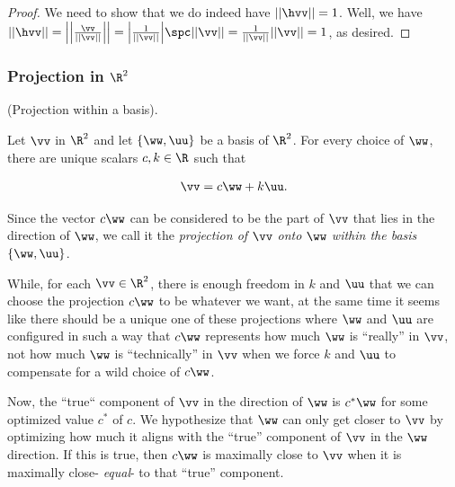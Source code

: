\begin{proof}
	We need to show that we do indeed have $||\hvv|| = 1$. Well, we have $||\hvv|| = \Big|\Big|\frac{\vv}{||\vv||}\Big|\Big| = \Big|\frac{1}{||\vv||}\Big| \spc ||\vv|| = \frac{1}{||\vv||} ||\vv|| = 1$, as desired.
\end{proof}

\subsubsection*{Projection in $\R^2$}

\begin{defn}
	(Projection within a basis).
	
	Let $\vv$ in $\R^2$ and let $\{\ww, \uu\}$ be a basis of $\R^2$. For every choice of $\ww$, there are unique scalars $c, k \in \R$ such that
	
	\begin{align*}
		\vv = c \ww + k \uu.
	\end{align*}
	
	Since the vector $c\ww$ can be considered to be the part of $\vv$ that lies in the direction of $\ww$, we call it the \textit{projection of $\vv$ onto $\ww$ within the basis $\{\ww, \uu\}$}.
\end{defn}

While, for each $\vv \in \R^2$, there is enough freedom in $k$ and $\uu$ that we can choose the projection $c\ww$ to be whatever we want, at the same time it seems like there should be a unique one of these projections where $\ww$ and $\uu$ are configured in such a way that $c\ww$ represents how much $\ww$ is ``really'' in $\vv$, not how much $\ww$ is ``technically'' in $\vv$ when we force $k$ and $\uu$ to compensate for a wild choice of $c\ww$. 

Now, the ``true`` component of $\vv$ in the direction of $\ww$ is $c^*\ww$ for some optimized value $c^*$ of $c$. We hypothesize that $\ww$ can only get closer to $\vv$ by optimizing how much it aligns with the ``true'' component of $\vv$ in the $\ww$ direction. If this is true, then $c\ww$ is maximally close to $\vv$ when it is maximally close- \textit{equal}- to that ``true'' component.

